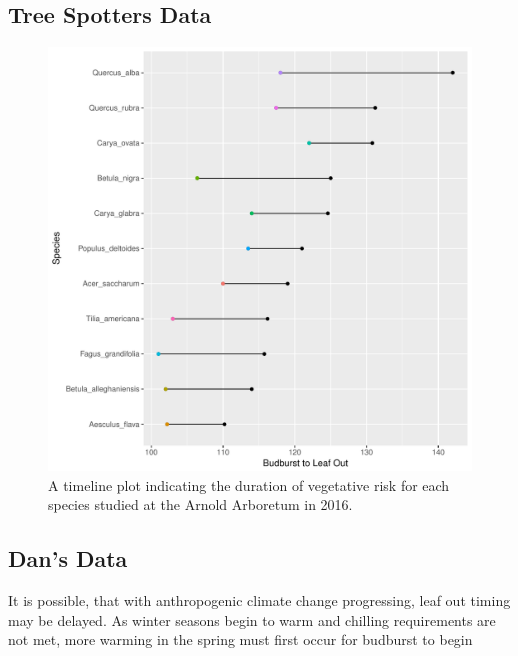 \documentclass{article}\usepackage[]{graphicx}\usepackage[]{color}
\makeatletter
\def\maxwidth{ %
  \ifdim\Gin@nat@width>\linewidth
    \linewidth
  \else
    \Gin@nat@width
  \fi
}
\makeatother
\begin{document}
\subsection{Tree Spotters Data}

\begin{figure}[H]
\includegraphics[width=\maxwidth]{figure/treespotters-1} \caption[A timeline plot indicating the duration of vegetative risk for each species studied at the Arnold Arboretum in 2016]{A timeline plot indicating the duration of vegetative risk for each species studied at the Arnold Arboretum in 2016.}\label{fig:treespotters}
\end{figure}



\subsection{Dan's Data}
It is possible, that with anthropogenic climate change progressing, leaf out timing may be delayed. As winter seasons begin to warm and chilling requirements are not met, more warming in the spring must first occur for budburst to begin \citep{Polgar2014, Fu2012, Morin2009, McCreary1990}
\end{document}
